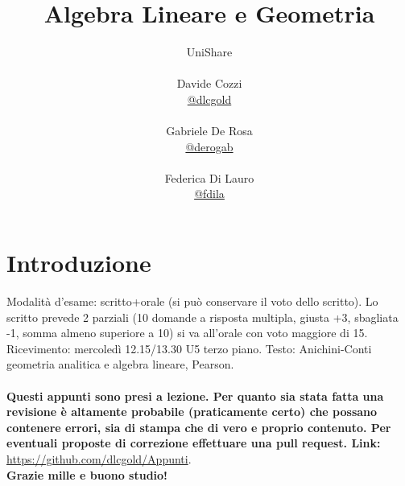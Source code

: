 \documentclass[a4paper,12pt, oneside]{book}
\title{Algebra Lineare e Geometria}
\author{UniShare\\\\Davide Cozzi\\\href{https://t.me/dlcgold}{@dlcgold}\\\\Gabriele De Rosa\\\href{https://t.me/derogab}{@derogab} \\\\Federica Di Lauro\\\href{https://t.me/f_dila}{@f\textunderscore dila}}
\date{}
\begin{document}
\maketitle


\newtheorem{teorema}{Teorema}
\newtheorem{definizione}{Definizione}
\newtheorem{esempio}{Esempio}
\newtheorem{corollario}{Corollario}
\newtheorem{lemma}{Lemma}
\newtheorem{osservazione}{Osservazione}
\newtheorem{nota}{Nota}
\newtheorem{esercizio}{Esercizio}
\tableofcontents
\renewcommand{\chaptermark}[1]{%
	\markboth{\chaptername
		\ \thechapter.\ #1}{}}
\renewcommand{\sectionmark}[1]{\markright{\thesection.\ #1}}
\newcommand{\norm}[1]{ \left\lVert {#1} \right\rVert}
\chapter{Introduzione}
Modalità d'esame: scritto+orale (si può conservare il voto dello scritto). Lo scritto prevede 2 parziali (10 domande a risposta multipla, giusta +3, sbagliata -1, somma almeno superiore a 10) si va all'orale con voto maggiore di 15.
Ricevimento: mercoledì 12.15/13.30 U5 terzo piano.
Testo: Anichini-Conti geometria analitica e algebra lineare, Pearson.\\
\\
\textbf{Questi appunti sono presi a lezione. Per quanto sia stata fatta una revisione è altamente probabile (praticamente certo) che possano contenere errori, sia di stampa che di vero e proprio contenuto. Per eventuali proposte di correzione effettuare una pull request. Link: } \url{https://github.com/dlcgold/Appunti}.\\
\textbf{Grazie mille e buono studio!}
\end{document}
